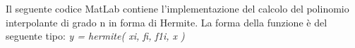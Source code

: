 Il seguente codice MatLab contiene l'implementazione del calcolo del polinomio interpolante di grado n in forma di Hermite. La forma della funzione è del seguente tipo: \textit{y = hermite( xi, fi, f1i, x )}\\\
